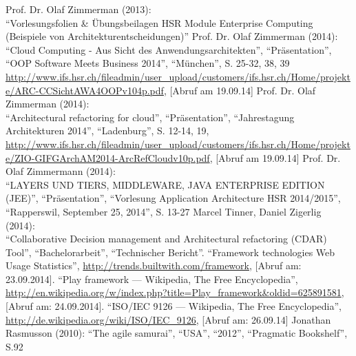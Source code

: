 \begin{thebibliography}{literatur}
	 Prof. Dr. Olaf Zimmerman (2013): \\
		"`Vorlesungsfolien \& Übungsbeilagen HSR Module Enterprise Computing (Beispiele von Architekturentscheidungen)"'
	 Prof. Dr. Olaf Zimmerman (2014): \\
		"`Cloud Computing - Aus Sicht des Anwendungsarchitekten"', "`Präsentation"', "`OOP Software Meets Business 2014"', "`München"', S. 25-32, 38, 39
		\url{http://www.ifs.hsr.ch/fileadmin/user\_upload/customers/ifs.hsr.ch/Home/projekte/ARC-CCSichtAWA4OOPv104p.pdf}, 
		[Abruf am 19.09.14]
	 Prof. Dr. Olaf Zimmerman (2014): \\
		"`Architectural refactoring for cloud"', "`Präsentation"', "`Jahrestagung Architekturen 2014"', "`Ladenburg"', S. 12-14, 19,
		\url{http://www.ifs.hsr.ch/fileadmin/user\_upload/customers/ifs.hsr.ch/Home/projekte/ZIO-GIFGArchAM2014-ArcRefCloudv10p.pdf}, 
		[Abruf am 19.09.14]
	 Prof. Dr. Olaf Zimmermann (2014): \\
		"`LAYERS UND TIERS, MIDDLEWARE, JAVA ENTERPRISE EDITION (JEE)"', "`Präsentation"', "`Vorlesung Application Architecture HSR 2014/2015"', "`Rapperswil, September 25, 2014"', S. 13-27
	 Marcel Tinner, Daniel Zigerlig (2014): \\
		"`Collaborative Decision management and Architectural refactoring (CDAR) Tool"', "`Bachelorarbeit"', "`Technischer Bericht"'.
	 "`Framework technologies Web Usage Statistics"',
		\url{http://trends.builtwith.com/framework}, [Abruf am: 23.09.2014].
	 "`Play framework --- Wikipedia{,} The Free Encyclopedia"',
		\url{http://en.wikipedia.org/w/index.php?title=Play_framework&oldid=625891581}, [Abruf am: 24.09.2014].
	 "`ISO/IEC 9126 --- Wikipedia{,} The Free Encyclopedia"',
		\url{http://de.wikipedia.org/wiki/ISO/IEC_9126}, [Abruf am: 26.09.14]
	 Jonathan Rasmusson (2010):
		"`The agile samurai"', "`USA"', "`2012"', "`Pragmatic Bookshelf"', S.92

\end{thebibliography}